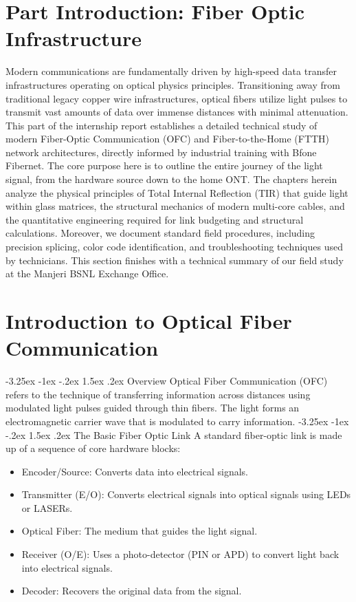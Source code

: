 \documentclass[11pt,a4paper]{report}
\makeatletter
\renewcommand{\section}{\@startsection{section}{1}{\z@}%
  {-3.25ex \@plus -1ex \@minus -.2ex}%
  {1.5ex \@plus.2ex}%
  {\normalfont\Large\bfseries\color{primaryColor}}}
\makeatother
\begin{document}
\chapter*{Part Introduction: Fiber Optic Infrastructure}
Modern communications are fundamentally driven by high-speed data transfer infrastructures operating on optical physics principles. Transitioning away from traditional legacy copper wire infrastructures, optical fibers utilize light pulses to transmit vast amounts of data over immense distances with minimal attenuation. This part of the internship report establishes a detailed technical study of modern Fiber-Optic Communication (OFC) and Fiber-to-the-Home (FTTH) network architectures, directly informed by industrial training with Bfone Fibernet. The core purpose here is to outline the entire journey of the light signal, from the hardware source down to the home ONT. The chapters herein analyze the physical principles of Total Internal Reflection (TIR) that guide light within glass matrices, the structural mechanics of modern multi-core cables, and the quantitative engineering required for link budgeting and structural calculations. Moreover, we document standard field procedures, including precision splicing, color code identification, and troubleshooting techniques used by technicians. This section finishes with a technical summary of our field study at the Manjeri BSNL Exchange Office.
\chapter{Introduction to Optical Fiber Communication}
\section{Overview}
Optical Fiber Communication (OFC) refers to the technique of transferring information across distances using modulated light pulses guided through thin fibers. The light forms an electromagnetic carrier wave that is modulated to carry information.
\section{The Basic Fiber Optic Link}
A standard fiber-optic link is made up of a sequence of core hardware blocks:
\begin{itemize}
  \item Encoder/Source: Converts data into electrical signals.
  \item Transmitter (E/O): Converts electrical signals into optical signals using LEDs or LASERs.
  \item Optical Fiber: The medium that guides the light signal.
  \item Receiver (O/E): Uses a photo-detector (PIN or APD) to convert light back into electrical signals.
  \item Decoder: Recovers the original data from the signal.
\end{itemize}
\end{document}
